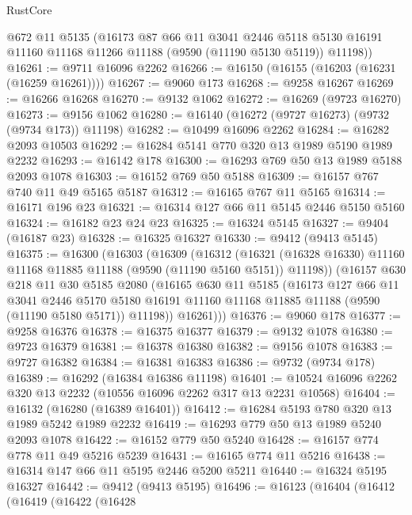 \begin{lexlean}{RustCore}
\begin{coremodule}
      @672
      @11
      @5135
      (@16173
        @87
        @66
        @11
        @3041
        @2446
        @5118
        @5130
        @16191
        @11160
        @11168
        @11266
        @11188
        (@9590 (@11190 @5130 @5119))
        @11198))
@16261 := @9711 @16096 @2262
@16266 := @16150 (@16155 (@16203 (@16231 (@16259 @16261))))
@16267 := @9060 @173
@16268 := @9258 @16267
@16269 := @16266 @16268
@16270 := @9132 @1062
@16272 := @16269 (@9723 @16270)
@16273 := @9156 @1062
@16280 := @16140 (@16272 (@9727 @16273) (@9732 (@9734 @173)) @11198)
@16282 := @10499 @16096 @2262
@16284 := @16282 @2093 @10503
@16292 := @16284 @5141 @770 @320 @13 @1989 @5190 @1989 @2232
@16293 := @16142 @178
@16300 := @16293 @769 @50 @13 @1989 @5188 @2093 @1078
@16303 := @16152 @769 @50 @5188
@16309 := @16157 @767 @740 @11 @49 @5165 @5187
@16312 := @16165 @767 @11 @5165
@16314 := @16171 @196 @23
@16321 := @16314 @127 @66 @11 @5145 @2446 @5150 @5160
@16324 := @16182 @23 @24 @23
@16325 := @16324 @5145
@16327 := @9404 (@16187 @23)
@16328 := @16325 @16327
@16330 := @9412 (@9413 @5145)
@16375 := @16300
    (@16303
      (@16309
        (@16312
          (@16321 (@16328 @16330) @11160 @11168 @11885 @11188 (@9590 (@11190 @5160 @5151)) @11198))
        (@16157
          @630
          @218
          @11
          @30
          @5185
          @2080
          (@16165
            @630
            @11
            @5185
            (@16173
              @127
              @66
              @11
              @3041
              @2446
              @5170
              @5180
              @16191
              @11160
              @11168
              @11885
              @11188
              (@9590 (@11190 @5180 @5171))
              @11198))
          @16261)))
@16376 := @9060 @178
@16377 := @9258 @16376
@16378 := @16375 @16377
@16379 := @9132 @1078
@16380 := @9723 @16379
@16381 := @16378 @16380
@16382 := @9156 @1078
@16383 := @9727 @16382
@16384 := @16381 @16383
@16386 := @9732 (@9734 @178)
@16389 := @16292 (@16384 @16386 @11198)
@16401 := @10524 @16096 @2262 @320 @13 @2232 (@10556 @16096 @2262 @317 @13 @2231 @10568)
@16404 := @16132 (@16280 (@16389 @16401))
@16412 := @16284 @5193 @780 @320 @13 @1989 @5242 @1989 @2232
@16419 := @16293 @779 @50 @13 @1989 @5240 @2093 @1078
@16422 := @16152 @779 @50 @5240
@16428 := @16157 @774 @778 @11 @49 @5216 @5239
@16431 := @16165 @774 @11 @5216
@16438 := @16314 @147 @66 @11 @5195 @2446 @5200 @5211
@16440 := @16324 @5195 @16327
@16442 := @9412 (@9413 @5195)
@16496 := @16123
    (@16404
      (@16412
        (@16419
          (@16422
            (@16428

\end{coremodule}
\end{lexlean}
